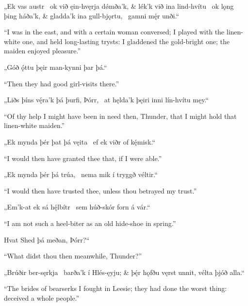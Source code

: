 \bvg
\bva{}„Ek vas austr \hld\ ok við ęin-hvęrja dǿmða’k, &
lék’k við ina lind-hvítu \hld\ ok lǫng þing háða’k, &
gladda’k ina gull-bjǫrtu, \hld\ gamni mę́r unði.“\eva

\bvb “I was in the east, and with a certain woman conversed; I played with the linen-white one, and held long-lasting trysts: I gladdened the gold-bright one; the maiden enjoyed pleasure.”\evb
\evg


\bvg
\bva{}„Góð ǫ́ttu þęir man-kynni þar þá.“\eva

\bvb “Then they had good girl-visits there.”\evb
\evg


\bvg
\bva{}„Liðs þíns vę́ra’k þá þurfi, Þórr, \hld\ at hęlda’k þęiri inni lín-hvítu męy.“\eva

\bvb “Of thy help I might have been in need then, Thunder, that I might hold that linen-white maiden.”\evb
\evg


\bvg
\bva{}„Ek mynda þér þat þá vęita \hld\ ef ek viðr of kę́misk.“\eva

\bvb “I would then have granted thee that, if I were able.”\evb
\evg


\bvg
\bva{}„Ek mynda þér þá trúa, \hld\ nema mik í tryggð véltir.“\eva

\bvb “I would then have trusted thee, unless thou betrayed my trust.”\evb
\evg


\bvg
\bva{}„Em’k-at ek sá hę́lbítr \hld\ sem húð-skór forn á vár.“\eva

\bvb “I am not such a heel-biter as an old hide-shoe in spring.”\evb
\evg


\bvg
\bva{}\ind Hvat Shed þá meðan, Þórr?“\eva

\bvb “What didst thou then meanwhile, Thunder?”\evb
\evg


\bvg
\bva{}„Brúðir ber-sęrkja \hld\ barða’k í Hlés-ęyju; &
þę́r hǫfðu vęrst unnit, \hld vélta þjóð alla.“\eva

\bvb “The brides of bearserks I fought in Leesie; they had done the worst thing: deceived a whole people.”\evb
\evg


